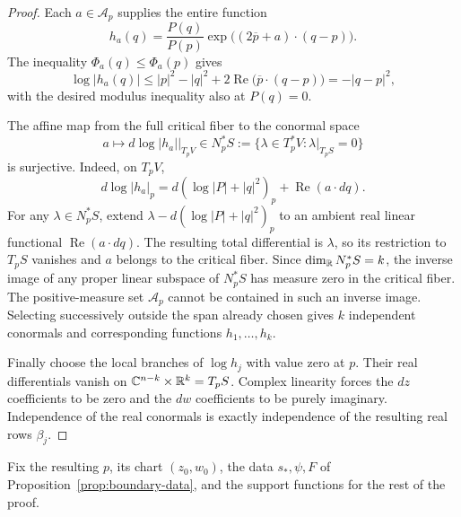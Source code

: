 \begin{proof}
Each $a\in\mathcal A_p$ supplies the entire function
\[
 h_a(q)=\frac{P(q)}{P(p)}
       \exp\bigl((2\overline p+a)\cdot(q-p)\bigr).
\]
The inequality $\Phi_a(q)\leq\Phi_a(p)$ gives
\[
 \log|h_a(q)|
 \leq |p|^2-|q|^2
       +2\operatorname{Re}\bigl(\overline p\cdot(q-p)\bigr)
 =-|q-p|^2,
\]
with the desired modulus inequality also at $P(q)=0$.

The affine map from the full critical fiber to the conormal space
\[
 a\longmapsto
 \left.d\log|h_a|\right|_{T_pV}
 \in N_p^*S
 :=\{\lambda\in T_p^*V:\lambda|_{T_pS}=0\}
\]
is surjective.  Indeed, on $T_pV$,
\[
 d\log|h_a|_p
   =d(\log|P|+|q|^2)_p+\operatorname{Re}(a\cdot dq).
\]
For any $\lambda\in N_p^*S$, extend
$\lambda-d(\log|P|+|q|^2)_p$ to an ambient real linear functional
$\operatorname{Re}(a\cdot dq)$.  The resulting total differential is
$\lambda$, so its restriction to $T_pS$ vanishes and $a$ belongs to
the critical fiber.  Since
$\dim_{\mathbb R}N_p^*S=k$, the inverse image of any proper linear
subspace of $N_p^*S$ has measure zero in the critical fiber.
The positive-measure set $\mathcal A_p$ cannot be contained in such
an inverse image.  Selecting successively outside the span already
chosen gives $k$ independent conormals and corresponding functions
$h_1,\ldots,h_k$.

Finally choose the local branches of $\log h_j$ with value zero
at $p$.  Their real differentials vanish on
$\mathbb C^{n-k}\times\mathbb R^k=T_pS$.  Complex linearity forces the
$dz$ coefficients to be zero and the $dw$ coefficients to be
purely imaginary.  Independence of the real conormals is exactly
independence of the resulting real rows $\beta_j$.
\end{proof}

Fix the resulting $p$, its chart $(z_0,w_0)$, the data
$s_*,\psi,F$ of Proposition~\ref{prop:boundary-data}, and the
support functions for the rest of the proof.
